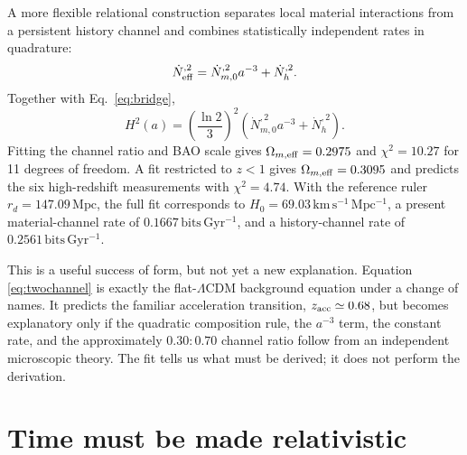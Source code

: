 \documentclass[10pt,twocolumn]{article}
\newcommand{\LCDM}{$\Lambda$CDM}
\newcommand{\kmsmpc}{\mathrm{km\,s^{-1}\,Mpc^{-1}}}
\begin{document}
A more flexible relational construction separates local material interactions
from a persistent history channel and combines statistically independent rates
in quadrature:
\begin{equation}
 \dot N_{\rm eff}^{,2}
 =\dot N_{m,0}^{,2}a^{-3}+\dot N_h^{,2}.
 \label{eq:channels}
\end{equation}
Together with Eq.~\eqref{eq:bridge},
\begin{equation}
 H^2(a)=\left(\frac{\ln2}{3}\right)^2
 \left(\dot N_{m,0}^{,2}a^{-3}+\dot N_h^{,2}\right).
 \label{eq:twochannel}
\end{equation}
Fitting the channel ratio and BAO scale gives
$\Omega_{m,\rm eff}=0.2975$ and $\chi^2=10.27$ for 11 degrees of freedom.
A fit restricted to $z<1$ gives $\Omega_{m,\rm eff}=0.3095$ and predicts the
six high-redshift measurements with $\chi^2=4.74$.  With the reference ruler
$r_d=147.09\,\mathrm{Mpc}$, the full fit corresponds to
$H_0=69.03\,\kmsmpc$, a present material-channel rate of
$0.1667\,\mathrm{bits\,Gyr^{-1}}$, and a history-channel rate of
$0.2561\,\mathrm{bits\,Gyr^{-1}}$.

This is a useful success of form, but not yet a new explanation.  Equation
\eqref{eq:twochannel} is exactly the flat-\LCDM{} background equation under a
change of names.  It predicts the familiar acceleration transition,
$z_{\rm acc}\simeq0.68$, but becomes explanatory only if the quadratic
composition rule, the $a^{-3}$ term, the constant rate, and the approximately
$0.30{:}0.70$ channel ratio follow from an independent microscopic theory.
The fit tells us what must be derived; it does not perform the derivation.

\section{Time must be made relativistic}
\end{document}
